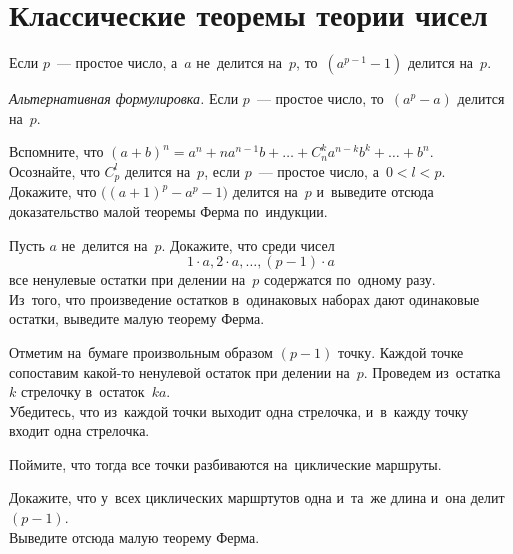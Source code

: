
\section*{Классические теоремы теории чисел}


\begingroup
    \ifx\mathup\undefined
	\def\eulerphi{\upphi}
    \else
	\def\eulerphi{\mathup{\phi}}
    \fi

Если $p$~--- простое число, а~$a$ не~делится на~$p$, то~$(a^{p-1} - 1)$ делится на~$p$.
\par
\emph{Альтернативная формулировка.}
Если $p$~--- простое число, то~$(a^p - a)$ делится на~$p$.

\begin{problems}

\item
\subproblem
Вспомните, что
\(
    (a + b)^n
=
    a^n + n a^{n-1} b +
    \ldots +
    C_{n}^{k} a^{n-k} b^k +
    \ldots +
    b^n
\).
\\
\subproblem
Осознайте, что $C_{p}^{l}$ делится на~$p$, если $p$~--- простое число,
а~$0 < l < p$.
\\
\subproblem
Докажите, что $\bigl( (a + 1)^p - a^p - 1 \bigr)$ делится на~$p$ и~выведите
отсюда доказательство малой теоремы Ферма по~индукции.

\item \subproblem
Пусть $a$ не~делится на~$p$.
Докажите, что среди чисел
\[
    1 \cdot a, 2 \cdot a, \ldots, (p - 1) \cdot a
\]
все ненулевые остатки при делении на~$p$ содержатся по~одному разу.
\\
\subproblem
Из~того, что произведение остатков в~одинаковых наборах дают одинаковые
остатки, выведите малую теорему Ферма.

\item
\subproblem
Отметим на~бумаге произвольным образом $(p - 1)$ точку.
Каждой точке сопоставим какой-то ненулевой остаток при делении на~$p$.
Проведем из~остатка~$k$ стрелочку в~остаток~$k a$.
\\
\subproblem
Убедитесь, что из~каждой точки выходит одна стрелочка, и~в~кажду точку входит
одна стрелочка.
\\
\subproblem

Поймите, что тогда все точки разбиваются на~циклические маршруты.
\\
\subproblem

Докажите, что у~всех циклических маршртутов одна и~та~же длина и~она делит
$(p - 1)$.
\\
\subproblem
Выведите отсюда малую теорему Ферма.

\end{problems}

